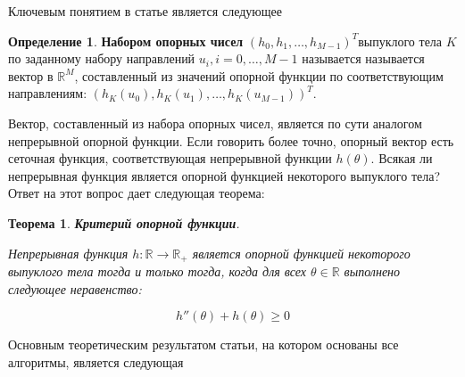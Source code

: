 \documentclass[a4paper, 12pt, titlepage]{article}
\theoremstyle{definition}
\newtheorem{SmartDefinition}{Определение}
\theoremstyle{plain}
\newtheorem{SmartTheorem}{Теорема}
\theoremstyle{plain}
\begin{document}
Ключевым понятием в статье является следующее

\begin{SmartDefinition}
 \label{def:support-vector}
 \textbf{Набором опорных чисел}
 $(h_{0}, h_{1}, \ldots, h_{M - 1})^{T}$выпуклого тела $K$ по заданному набору
 направлений $u_{i}, i = 0, \ldots, M - 1$ называется называется вектор в
 $\mathbb{R}^{M}$, составленный из значений опорной функции по соответствующим
 направлениям: $(h_{K}(u_{0}), h_{K}(u_{1}), \ldots, h_{K}(u_{M - 1}))^{T}$.
\end{SmartDefinition}

Вектор, составленный из набора опорных чисел, является по сути аналогом
непрерывной опорной функции. Если говорить более точно, опорный вектор есть
сеточная функция, соответствующая непрерывной функции $h(\theta)$. Всякая ли
непрерывная функция является опорной функцией некоторого выпуклого тела? Ответ
на этот вопрос дает следующая теорема:

\begin{SmartTheorem}
 \label{thm:support-function-criterion}
 \textbf{Критерий опорной функции}.

 Непрерывная функция $h : \mathbb{R} \to \mathbb{R}_{+}$ является опорной
 функцией некоторого выпуклого тела тогда и только тогда, когда для всех
 $\theta \in \mathbb{R}$ выполнено следующее неравенство:

 \begin{equation}
 h''(\theta) + h(\theta) \geq 0
 \end{equation}
\end{SmartTheorem}


Основным теоретическим результатом статьи, на котором основаны все алгоритмы,
является следующая
\end{document}

